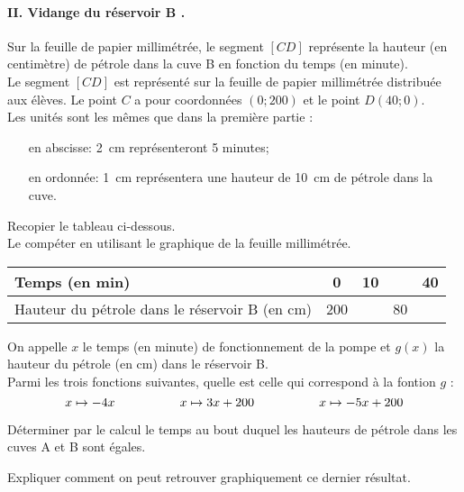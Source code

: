 \paragraph{II. Vidange du réservoir B .}\hfill\newline
Sur la feuille de papier millimétrée, le segment $[CD]$ représente la
hauteur (en centimètre) de pétrole dans la cuve B en fonction du temps
(en minute).
\\Le segment $[CD]$ est représenté sur la feuille de papier
millimétrée distribuée aux élèves. Le point $C$ a pour coordonnées
$(0;200)$ et le point $D(40;0)$.
\\Les unités sont les mêmes que dans la première partie :
\begin{itemize}
  \item[en abscisse:] 2~cm représenteront 5 minutes;
  \item[en ordonnée:] 1~cm représentera une hauteur de 10~cm de
    pétrole dans la cuve.
\end{itemize}
\begin{myenumerate}
  \item Recopier le tableau ci-dessous.\\Le compéter en utilisant le graphique de la feuille millimétrée.
    \begin{center}
      \begin{tabular}{|l|c|c|c|c|}
        \hline
        Temps (en min)&0&10&&40\\
        \hline
        Hauteur du pétrole dans le réservoir B (en cm)&200&&80&\\
        \hline
      \end{tabular}
    \end{center}
  \item On appelle $x$ le temps (en minute) de fonctionnement de la
    pompe et $g(x)$ la hauteur du pétrole (en cm) dans le réservoir B.
    \\Parmi les trois fonctions suivantes, quelle est celle qui
    correspond à la fontion $g$ :
    \[x\mapsto-4x\kern0.15\linewidth x\mapsto3x+200\kern0.15\linewidth x\mapsto-5x+200\]
  \item Déterminer par le calcul le temps au bout duquel les hauteurs
    de pétrole dans les cuves A et B sont égales.
  \item Expliquer comment on peut retrouver graphiquement ce dernier résultat.
\end{myenumerate}